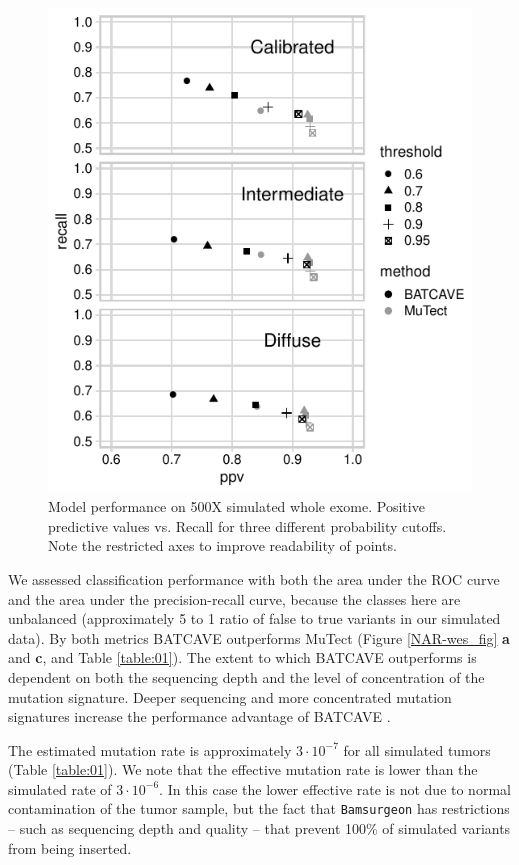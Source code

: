 \documentclass[a4,center,fleqn]{NAR}
\newcommand{\batcave}{BATCAVE }
\begin{document}
\begin{figure}
  \begin{center}
  \includegraphics{figures/ppv_wes.pdf}
  \end{center}
  \caption{Model performance on 500X simulated whole exome. 
  Positive predictive values vs. Recall for three different probability cutoffs. 
  Note the restricted axes to improve readability of points.}
\label{NAR-ppv_fig}
\end{figure}

We assessed classification performance with both the area under the ROC curve and the area under the precision-recall curve, because the classes here are unbalanced (approximately 5 to 1 ratio of false to true variants in our simulated data).
By both metrics \batcave outperforms MuTect (Figure \ref{NAR-wes_fig} \textbf{a} and \textbf{c}, and Table \ref{table:01}).
The extent to which \batcave outperforms is dependent on both the sequencing depth and the level of concentration of the mutation signature.
Deeper sequencing and more concentrated mutation signatures increase the performance advantage of \batcave. 

The estimated mutation rate is approximately $3\cdot10^{-7}$ for all simulated tumors (Table \ref{table:01}).
We note that the effective mutation rate is lower than the simulated rate of $3\cdot10^{-6}$.
In this case the lower effective rate is not due to normal contamination of the tumor sample, but the fact that \texttt{Bamsurgeon} has restrictions -- such as sequencing depth and quality -- that prevent 100\% of simulated variants from being inserted. 
\end{document}
